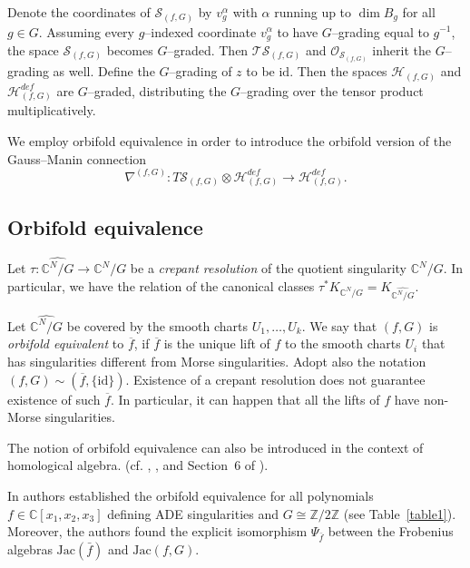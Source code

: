 \documentclass[reqno,12pt]{amsart}
\numberwithin{equation}{section}
\theoremstyle{plain}
\theoremstyle{definition}
\newcommand{\CC}{{\mathbb{C}}}
\newcommand{\ZZ}{{\mathbb{Z}}}
\newcommand{\Jac}{\mathrm{Jac}}
\newcommand{\id}{\mathrm{id}}
\def\H{{\mathcal H}}
\def\O{{\mathcal O}}
\def\T{{\mathcal T}}
\numberwithin{equation}{section}
\begin{document}
Denote the coordinates of $\mathcal{S}_{(f,G)}$ by $v_{g}^\alpha$ with $\alpha$ running up to $\dim B_g$ for all $g\in G$. 
Assuming every $g$--indexed coordinate $v_g^\alpha$ to have $G$--grading equal to $g^{-1}$, the space $\mathcal{S}_{(f,G)}$ becomes $G$--graded. Then $\T\mathcal{S}_{(f,G)}$ and $\O_{\mathcal{S}_{(f,G)}}$ inherit the $G$--grading as well.
Define the $G$--grading of $z$ to be $\id$. Then the spaces $\H_{(f,G)}$ and $\H^{def}_{(f,G)}$ are $G$--graded, distributing the $G$--grading over the tensor product multiplicatively.


We employ orbifold equivalence in order to introduce the orbifold version of the Gauss--Manin connection 
\[
    \nabla^{(f,G)}: T\mathcal{S}_{(f,G)} \otimes \H^{def}_{(f,G)} \to \H^{def}_{(f,G)}.
\]


\subsection*{Orbifold equivalence}
Let $\tau \colon \widehat{\CC^N/G} \to \CC^N/G$ be a \emph{crepant resolution} of the quotient singularity $\CC^N/G$. In particular, we have the relation of the canonical classes $\tau^*K_{\CC^N/G} = K_{\widehat{\CC^N/G}}$. 

Let $\widehat{\CC^N/G}$ be covered by the smooth charts $U_1, \dots, U_k$. 
We say that $(f,G)$ is \textit{orbifold equivalent} to $\overline{f}$, if $\overline{f}$ is the unique lift of $f$ to the smooth charts $U_i$ that has singularities different from Morse singularities. Adopt also the notation $(f,G)\sim (\overline{f},\{\id\})$.
Existence of a crepant resolution does not guarantee existence of such $\overline{f}$. In particular, it can happen that all the lifts of $f$ have non-Morse singularities.

The notion of orbifold equivalence can also be introduced in the context of homological algebra. (cf. \cite{Io}, \cite{Orl1}, \cite{Orl2} and Section~6 of \cite{BT1}).

In \cite{BTW1} authors established the orbifold equivalence for all polynomials ${f \in \CC[x_1,x_2,x_3]}$ defining ADE singularities and $G \cong \ZZ/2\ZZ$ (see Table~\ref{table1}). Moreover, the authors found the explicit isomorphism $\Psi_{\bar{f}}$ between the Frobenius algebras $\Jac(\bar{f})$ and $\Jac(f,G)$.
\end{document}
